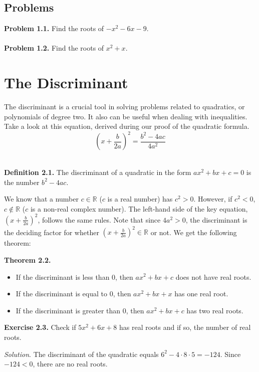 \documentclass{article}
\begin{document}
\subsection{Problems}
\textbf{Problem 1.1.} Find the roots of $-x^2-6x-9$.\\\\
\textbf{Problem 1.2.} Find the roots of $x^2+x$.

\section{The Discriminant}
The discriminant is a crucial tool in solving problems related to quadratics, or polynomials of degree two. It also can be useful when dealing with inequalities.\\

Take a look at this equation, derived during our proof of the quadratic formula.
$$(x+\frac{b}{2a})^2=\frac{b^2-4ac}{4a^2}$$\\

\begin{mdframed}
  \textbf{Definition 2.1.} The discriminant of a quadratic in the form $ax^2+bx+c=0$ is the number $b^2-4ac$.
\end{mdframed}

We know that a number $c \in \mathbb{R}$ ($c$ is a real number) has $c^2>0$. However, if $c^2<0$, $c \not\in \mathbb{R}$ ($c$ is a non-real complex number). The left-hand side of the key equation, $(x+\frac{b}{2a})^2$, follows the same rules. Note that since $4a^2 > 0$, the discriminant is the deciding factor for whether $(x+\frac{b}{2a})^2 \in \mathbb{R}$ or not. We get the following theorem:\\

\begin{mdframed}
    \textbf{Theorem 2.2.}
    \begin{itemize}
        \item If the discriminant is less than 0, then $ax^2+bx+c$ does not have real roots.
        \item If the discriminant is equal to 0, then $ax^2+bx+x$ has one real root.
        \item If the discriminant is greater than 0, then $ax^2+bx+c$ has two real roots.
    \end{itemize}
\end{mdframed}

\begin{mdframed}
  \textbf{Exercise 2.3.} Check if $5x^2+6x+8$ has real roots and if so, the number of real roots.
\end{mdframed}
\emph{Solution}. The discriminant of the quadratic equals $6^2-4\cdot8\cdot5 = -124$. Since $-124 < 0$, there are no real roots.
\end{document}

